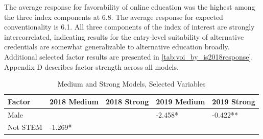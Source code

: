 \documentclass[AER]{./aea-latex-templates/AEA}
\begin{document}
        The average response for favorability of online education was the highest among the three
        index components at 6.8.
        The average response for expected conventionality is 6.1.
        All three components of the index of interest are strongly intercorrelated,
        indicating results for the entry-level suitability of alternative credentials
        are somewhat generalizable to alternative education broadly.
        Additional selected factor results are presented in \ref{tab:voi_by_is2018response}.
        Appendix D describes factor strength across all models.
        
        \begin{table}
            \caption{Medium and Strong Models, Selected Variables}
            \begin{tabular}{lllll}
            Factor & 2018 Medium & 2018 Strong & 2019 Medium & 2019 Strong \\
            \toprule
            Male &  &  & -2.458* & -0.422** \\
            Not STEM & -1.269* \\ %

\end{tabular}
\end{table}
\end{document}
